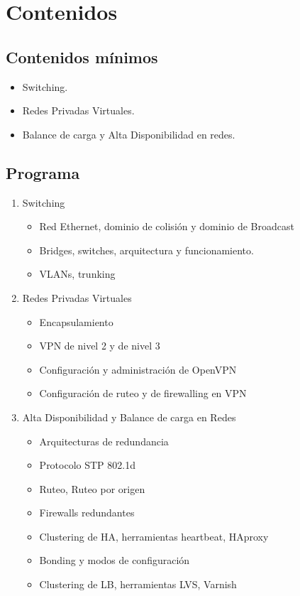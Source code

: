 \section {Contenidos}
\subsection{Contenidos mínimos}
\begin{itemize} 
	\item Switching. 
	\item Redes Privadas Virtuales. 
	\item Balance de carga y Alta Disponibilidad en redes. 
\end{itemize}


\subsection {Programa}
\begin{enumerate}
	\item Switching
		\begin{itemize}
			\item Red Ethernet, dominio de colisión y dominio de Broadcast
			\item Bridges, switches, arquitectura y funcionamiento. 
			\item VLANs, trunking
		\end{itemize}
	\item Redes Privadas Virtuales
		\begin{itemize}
			\item Encapsulamiento
			\item VPN de nivel 2 y de nivel 3
			\item Configuración y administración de OpenVPN
			\item Configuración de ruteo y de firewalling en VPN
		\end{itemize}
	\item Alta Disponibilidad y Balance de carga en Redes
		\begin{itemize}
			\item Arquitecturas de redundancia 
			\item Protocolo STP 802.1d
			\item Ruteo, Ruteo por origen 
			\item Firewalls redundantes
			\item Clustering de HA, herramientas heartbeat, HAproxy
			\item Bonding y modos de configuración
			\item Clustering de LB, herramientas LVS, Varnish 
		\end{itemize}

\end{enumerate}

